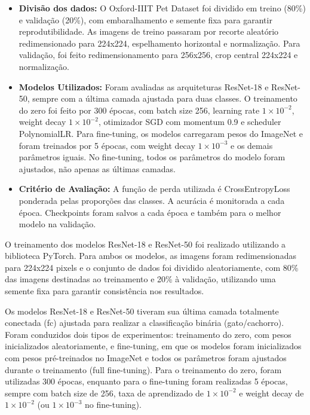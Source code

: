 \documentclass[%
 reprint,
 amsmath,amssymb,
 aps,
]{revtex4-2}
\begin{document}
    \begin{itemize}
        \item \textbf{Divisão dos dados:} O Oxford-IIIT Pet Dataset foi dividido em treino (80\%) e validação (20\%), com embaralhamento e semente fixa para garantir reprodutibilidade. As imagens de treino passaram por recorte aleatório redimensionado para 224x224, espelhamento horizontal e normalização. Para validação, foi feito redimensionamento para 256x256, crop central 224x224 e normalização.
        \item \textbf{Modelos Utilizados:} Foram avaliadas as arquiteturas ResNet-18 e ResNet-50, sempre com a última camada ajustada para duas classes. O treinamento do zero foi feito por 300 épocas, com batch size 256, learning rate $1\times10^{-2}$, weight decay $1\times10^{-2}$, otimizador SGD com momentum 0.9 e scheduler PolynomialLR. Para fine-tuning, os modelos carregaram pesos do ImageNet e foram treinados por 5 épocas, com weight decay $1\times10^{-3}$ e os demais parâmetros iguais. No fine-tuning, todos os parâmetros do modelo foram ajustados, não apenas as últimas camadas.
        \item \textbf{Critério de Avaliação:} A função de perda utilizada é CrossEntropyLoss ponderada pelas proporções das classes. A acurácia é monitorada a cada época. Checkpoints foram salvos a cada época e também para o melhor modelo na validação.

    \end{itemize}


O treinamento dos modelos ResNet-18 e ResNet-50 foi realizado utilizando a biblioteca PyTorch. Para ambos os modelos, as imagens foram redimensionadas para 224x224 pixels e o conjunto de dados foi dividido aleatoriamente, com 80\% das imagens destinadas ao treinamento e 20\% à validação, utilizando uma semente fixa para garantir consistência nos resultados.

Os modelos ResNet-18 e ResNet-50 tiveram sua última camada totalmente conectada (fc) ajustada para realizar a classificação binária (gato/cachorro). Foram conduzidos dois tipos de experimentos: treinamento do zero, com pesos inicializados aleatoriamente, e fine-tuning, em que os modelos foram inicializados com pesos pré-treinados no ImageNet e todos os parâmetros foram ajustados durante o treinamento (full fine-tuning). Para o treinamento do zero, foram utilizadas 300 épocas, enquanto para o fine-tuning foram realizadas 5 épocas, sempre com batch size de 256, taxa de aprendizado de $1 \times 10^{-2}$ e weight decay de $1 \times 10^{-2}$ (ou $1 \times 10^{-3}$ no fine-tuning).
\end{document}
